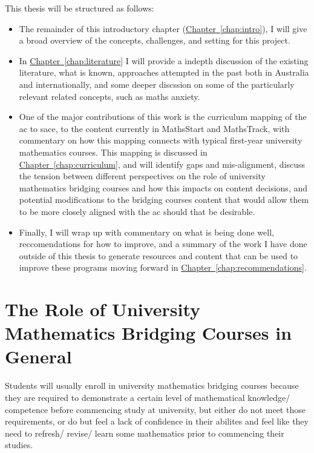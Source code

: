 \documentclass[twoside,12pt,a4paper]{report}
\newcommand{\refchap}[1]{\hyperref[chap:#1]{Chapter~\ref{chap:#1}}}
\begin{document}
This thesis will be structured as follows:
\begin{itemize}
	\item The remainder of this introductory chapter (\refchap{intro}), I will give a broad overview of the concepts, challenges, and setting for this project.
	\item In \refchap{literature} I will provide a indepth discussion of the existing literature, what is known, approaches attempted in the past both in Australia and internationally, and some deeper discssion on some of the particularly relevant related concepts, such as maths anxiety.
	\item One of the major contributions of this work is the curriculum mapping of the \gls{ac} to \gls{sace}, to the content currently in MathsStart and MathsTrack, with commentary on how this mapping connects with typical first-year university mathematics courses. This mapping is discussed in \refchap{curriculum}, and will identify gaps and mis-alignment, discuss the tension between different perspectives on the role of university mathematics bridging courses and how this impacts on content decisions, and potential modifications to the bridging courses content that would allow them to be more closely aligned with the \gls{ac} should that be desirable.
	\item Finally, I will wrap up with commentary on what is being done well, reccomendations for how to improve, and a summary of the work I have done outside of this thesis to generate resources and content that can be used to improve these programs moving forward in \refchap{recommendations}.
\end{itemize}



\section{The Role of University Mathematics Bridging Courses in General}

Students will usually enroll in university mathematics bridging courses because they are required to demonstrate a certain level of mathematical knowledge/ competence before commencing study at university, but either do not meet those requirements, or do but feel a lack of confidence in their abilites and feel like they need to refresh/ revise/ learn some mathematics prior to commencing their studies.
\end{document}
